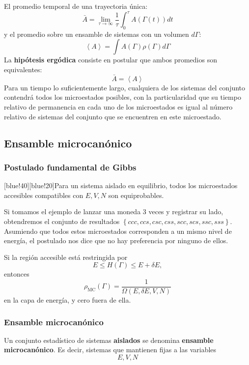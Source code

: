 \documentclass[]{article}
\numberwithin{equation}{section}
\newcommand{\0}{\textcolor{gray}{0}}
\begin{document}
El promedio temporal de una trayectoria única:
\begin{equation*}
	\bar{A} = \lim_{\tau\rightarrow\infty}\frac{1}{\tau}\int_{0}^{\tau}A(\Gamma(t))dt
\end{equation*}
y el promedio sobre un ensamble de sistemas con un volumen \(d\Gamma\):
\begin{equation*}
	\left\langle A\right\rangle = \int A(\Gamma)\rho(\Gamma)d\Gamma
\end{equation*}
La \textbf{hipótesis ergódica} consiste en postular que ambos promedios son equivalentes:
\begin{equation}
	\bar{A} = \left\langle A\right\rangle
\end{equation}
Para un tiempo lo suficientemente largo, cualquiera de los sistemas del conjunto contendrá todos los microestados posibles, con la particularidad que su tiempo relativo de permanencia en cada uno de los microestados es igual al número relativo de sistemas del conjunto que se encuentren en este microestado.

\subsection{Ensamble microcanónico}
\subsubsection{Postulado fundamental de Gibbs}
[blue!40][blue!20]{Para un sistema aislado en equilibrio, todos los microestados accesibles compatibles con \(E,V,N\) son equiprobables.}

Si tomamos el ejemplo de lanzar una moneda 3 veces y registrar su lado, obtendremos el conjunto de resultados \(\left\lbrace ccc, ccs, csc, css, scc, scs, ssc, sss \right\rbrace \). Asumiendo que todos estos microestados corresponden a un mismo nivel de energía, el postulado nos dice que no hay preferencia por ninguno de ellos.

Si la región accesible está restringida por
\begin{equation*}
	E \leq H(\Gamma) \leq E + \delta E ,
\end{equation*}
entonces
\begin{equation*}
	\rho_{\text{MC}}(\Gamma) = \frac{1}{\Omega(E,\delta E,V,N)}
\end{equation*}
en la capa de energía, y cero fuera de ella.

\subsubsection{Ensamble microcanónico}
Un conjunto estadístico de sistemas \textbf{aislados} se denomina \textbf{ensamble microcanónico}. Es decir, sistemas que mantienen fijas a las variables
\begin{equation*}
	E, V, N
\end{equation*}
\end{document}
